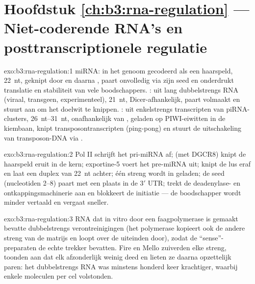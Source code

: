 \section*{Hoofdstuk \ref{ch:b3:rna-regulation} --- Niet-coderende RNA's en posttranscriptionele regulatie}

\begin{solution}{exo:b3:rna-regulation:1}
miRNA: in het genoom gecodeerd als een haarspeld, \qty{22}{nt},
geknipt door  en daarna , paart onvolledig via zijn seed en
onderdrukt translatie en stabiliteit van vele boodschappers. :
uit lang dubbelstrengs RNA (viraal, transgeen, experimenteel),
\qty{21}{nt}, Dicer-afhankelijk, paart volmaakt en stuurt 
aan om het doelwit te knippen. : uit enkelstrengs transcripten
van piRNA-clusters, \qtyrange{26}{31}{nt}, onafhankelijk van ,
geladen op PIWI-eiwitten in de kiembaan, knipt transposontranscripten
(ping-pong) en stuurt de uitschakeling van transposon-DNA via
.
\end{solution}

\begin{solution}{exo:b3:rna-regulation:2}
Pol II schrijft het pri-miRNA af;  (met DGCR8) knipt de
haarspeld eruit in de kern; exportine-5 voert het pre-miRNA uit; 
knipt de lus eraf en laat een duplex van \qty{22}{nt} achter; één
streng wordt in  geladen; de seed (nucleotiden 2--8) paart
met een plaats in de 3$'$ UTR;  trekt de deadenylase- en
ontkappingsmachinerie aan en blokkeert de initiatie --- de boodschapper
wordt minder vertaald en vergaat sneller.
\end{solution}

\begin{solution}{exo:b3:rna-regulation:3}
RNA dat in vitro door een faagpolymerase is gemaakt bevatte
dubbelstrengs verontreinigingen (het polymerase kopieert ook de andere
streng van de matrijs en loopt over de uiteinden door), zodat de
``sense''-preparaten de echte trekker bevatten. Fire en Mello
zuiverden elke streng, toonden aan dat elk afzonderlijk weinig deed en
lieten ze daarna opzettelijk paren: het dubbelstrengs RNA was minstens
honderd keer krachtiger, waarbij enkele moleculen per cel volstonden.
\end{solution}

